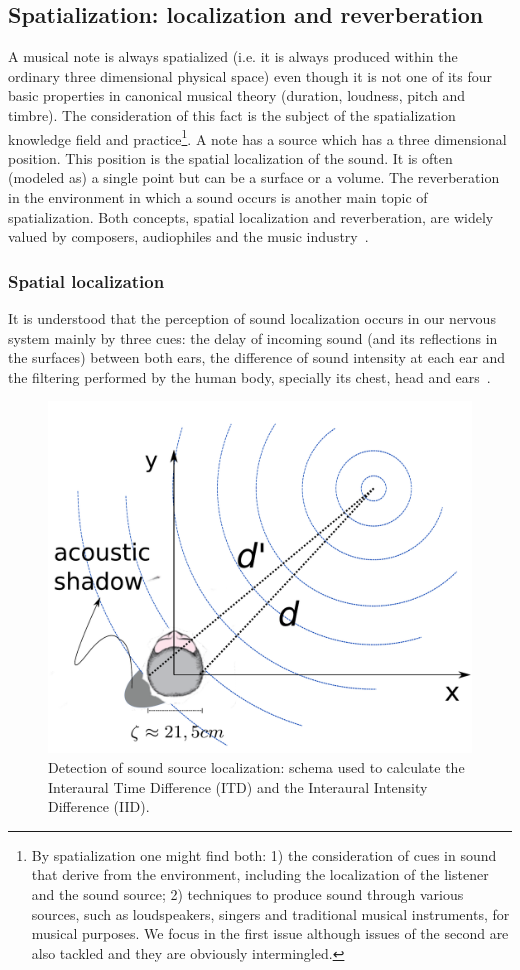 \subsection{Spatialization: localization and reverberation}\label{subsec:spac}
A musical note is always spatialized
(i.e. it is always produced within the ordinary three dimensional physical space)
even though it is not one of its four basic properties in canonical musical theory (duration, loudness, pitch and timbre).
The consideration of this fact is the subject of the spatialization knowledge field and practice\footnote{By
spatialization one might find both:
1) the consideration of cues in sound that derive from the environment,
including the localization of the listener and the sound source;
2) techniques to produce sound through various sources, such as loudspeakers, singers and traditional musical instruments, for musical purposes.
We focus in the first issue although issues of the second are also tackled
and they are obviously intermingled.}.
A note has a source which has a three dimensional position.
This position is the spatial localization of the sound.
It is often (modeled as) a single point but can be a surface or a volume.
The reverberation in the environment in which a sound occurs is another main topic of spatialization.
Both concepts, spatial localization and reverberation,
are widely valued by composers, audiophiles and the music industry~\cite{floEsp}.

\subsubsection{Spatial localization}
It is understood that the perception of sound localization occurs in our nervous system
mainly by three cues: the delay of incoming sound (and its reflections in the surfaces) between both ears,
the difference of sound intensity at each ear and the filtering performed by the human body,
specially its chest, head and ears~\cite{Roederer, hrtf, Heeger}. 

\begin{figure}[h!]
    \centering
        \includegraphics[width=.5\textwidth]{figures/espacializacao___}
    \caption{Detection of sound source localization: schema used to calculate the Interaural Time Difference (ITD) and the Interaural Intensity Difference (IID).}
    \label{fig:spac}
\end{figure}

